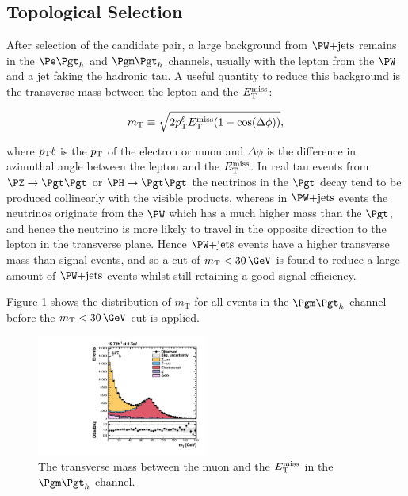 \subsection{Topological Selection}

After selection of the candidate pair, a large background from $\WJets$ remains
in the $\etau$ and $\mutau$ channels, usually with the lepton from the $\PW$ and
a jet faking the hadronic tau. A useful quantity to reduce this background is
the transverse mass between the lepton and the $E_{\mathrm{T}}^{\text{miss}}$:

\begin{equation}
m_{\text{T}}\equiv\sqrt{2p_{\mathrm{T}}^{\ell}E_{\mathrm{T}}^{\text{miss}}(1-\cos(\Delta\phi))},
\end{equation}

where $p_{\mathrm{T}}{\ell}$ is the $p_{\mathrm{T}}$ of the electron or muon and $\Delta\phi$ is the
difference in azimuthal angle between the lepton and the $E_{\mathrm{T}}^{\text{miss}}$. In real tau
events from $\PZ\to\Pgt\Pgt$ or $\PH\to\Pgt\Pgt$ the neutrinos in the $\Pgt$
decay tend to be produced collinearly with the visible products, whereas in
$\WJets$ events the neutrinos originate from the $\PW$ which has a much higher
mass than the $\Pgt$, and hence the neutrino is more likely to travel in the
opposite direction to the lepton in the transverse plane. Hence $\WJets$ events
have a higher transverse mass than signal events, and so a cut of
$m_{\text{T}}<30\,\GeV$ is found to reduce a large amount of $\WJets$ events
whilst still retaining a good signal efficiency.

Figure \ref{fig:transversemass} shows the distribution of $m_{\text{T}}$ for all
events in the $\mutau$ channel before the $m_{\text{T}}<30\,\GeV$ cut is
applied.

\begin{figure}[htb]
\begin{center}
    \includegraphics[width=0.5\textwidth]
      {plots/htt-sm/mt_1_inclusive_mt_2012.pdf}

\end{center}
\caption{
 The transverse mass between the muon and the $E_{\mathrm{T}}^{\text{miss}}$ in the $\mutau$ channel.  
}
\label{fig:transversemass}
\end{figure}


